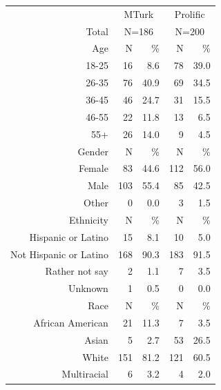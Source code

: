 \documentclass[a4paper,notitlepage,12pt]{article}
\begin{document}
\begin{table}[!h]
    \centering
    \small
    \setlength{\tabcolsep}{15pt}
    \begin{tabular}{ rrrrr }
        \toprule
        & \multicolumn{2}{c}{MTurk} & \multicolumn{2}{c}{Prolific} \\
        \cmidrule(lr){2-3} \cmidrule(lr){4-5}
        Total & \multicolumn{2}{c}{N=186} & \multicolumn{2}{c}{N=200} \\
        \midrule
        Age & N & \% & N & \% \\
        \cmidrule(lr){1-5}
        18-25   &      16 &   8.6 &       78 &  39.0 \\
        26-35   &      76 &  40.9 &       69 &  34.5 \\
        36-45   &      46 &  24.7 &       31 &  15.5 \\
        46-55   &      22 &  11.8 &       13 &   6.5 \\
        55+     &      26 &  14.0 &        9 &   4.5 \\
        \midrule
        Gender & N & \% & N & \% \\
        \cmidrule(lr){1-5}
        Female             &    83 &  44.6 &    112 &  56.0 \\
        Male               &   103 &  55.4 &     85 &  42.5 \\
        Other              &     0 &   0.0 &      3 &   1.5 \\
        \midrule
        Ethnicity & N & \% & N & \% \\
        \cmidrule(lr){1-5}
        Hispanic or Latino     &    15 &   8.1 &     10 &   5.0 \\
        Not Hispanic or Latino &   168 &  90.3 &    183 &  91.5 \\
        Rather not say         &     2 &   1.1 &      7 &   3.5 \\
        Unknown                &     1 &   0.5 &      0 &   0.0 \\
        \midrule
        Race & N & \% & N & \% \\
        \cmidrule(lr){1-5}
        African American                 &    21 &  11.3 &      7 &   3.5 \\
        Asian                                     &     5 &   2.7 &     53 &  26.5 \\
        White                                     &   151 &  81.2 &    121 &  60.5 \\
        Multiracial                               &     6 &   3.2 &      4 &   2.0 \\

\end{tabular}
\end{table}
\end{document}
